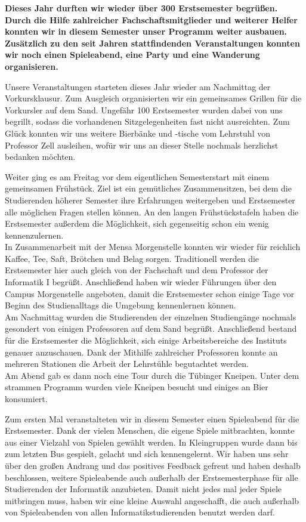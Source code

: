 \textbf{Dieses Jahr durften wir wieder über 300 Erstsemester begrüßen. Durch die Hilfe zahlreicher Fachschaftsmitglieder und weiterer Helfer konnten wir in diesem Semester unser Programm weiter ausbauen. Zusätzlich zu den seit Jahren stattfindenden Veranstaltungen konnten wir noch einen Spieleabend, eine Party und eine Wanderung organisieren.}
%

Unsere Veranstaltungen starteten dieses Jahr wieder am Nachmittag der Vorkursklausur. Zum Ausgleich organisierten wir ein gemeinsames Grillen für die Vorkursler auf dem Sand. Ungefähr 100 Erstsemester wurden dabei von uns begrillt, sodass die vorhandenen Sitzgelegenheiten fast nicht ausreichten. Zum Glück konnten wir uns weitere Bierbänke und -tische vom Lehrstuhl von Professor Zell ausleihen, wofür wir uns an dieser Stelle nochmals herzlichst bedanken möchten.

Weiter ging es am Freitag vor dem eigentlichen Semesterstart mit einem gemeinsamen Frühstück. Ziel ist ein gemütliches Zusammensitzen, bei dem die Studierenden höherer Semester ihre Erfahrungen weitergeben und Erstsemester alle möglichen Fragen stellen können. An den langen Frühstückstafeln haben die Erstsemester außerdem die Möglichkeit, sich gegenseitig schon ein wenig kennenzulernen.\\
In Zusammenarbeit mit der Mensa Morgenstelle konnten wir wieder für reichlich Kaffee, Tee, Saft, Brötchen und Belag sorgen. Traditionell werden die Erstsemester hier auch gleich von der Fachschaft und dem Professor der Informatik I begrüßt. Anschließend haben wir wieder Führungen über den Campus Morgenstelle angeboten, damit die Erstsemester schon einige Tage vor Beginn des Studienalltags die Umgebung kennenlernen können.\\
Am Nachmittag wurden die Studierenden der einzelnen Studiengänge nochmals gesondert von einigen Professoren auf dem Sand begrüßt. Anschließend bestand für die Erstsemester die Möglichkeit, sich einige Arbeitsbereiche des Instituts genauer anzuschauen. Dank der Mithilfe zahlreicher Professoren konnte an mehreren Stationen die Arbeit der Lehrstühle begutachtet werden.\\
Am Abend gab es dann noch eine Tour durch die Tübinger Kneipen. Unter dem strammen Programm wurden viele Kneipen besucht und einiges an Bier konsumiert.
%
%
%

Zum ersten Mal veranstalteten wir in diesem Semester einen Spieleabend für die Erstsemester. Dank der vielen Menschen, die eigene Spiele mitbrachten, konnte aus einer Vielzahl von Spielen gewählt werden. In Kleingruppen wurde dann bis zum letzten Bus gespielt, gelacht und sich kennengelernt. Wir haben uns sehr über den großen Andrang und das positives Feedback gefreut und haben deshalb beschlossen, weitere Spieleabende auch außerhalb der Erstsemesterphase für alle Studierenden der Informatik anzubieten. Damit nicht jedes mal jeder Spiele mitbringen muss, haben wir eine kleine Auswahl angeschafft, die auch außerhalb von Spieleabenden von allen Informatikstudierenden benutzt werden darf.

